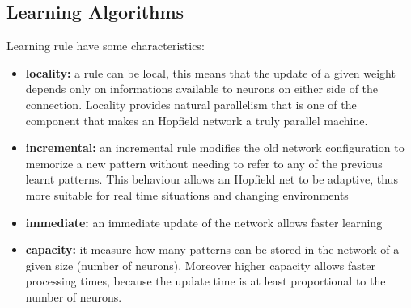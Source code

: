 \documentclass[letterpaper,twocolumn,10pt]{article}
\begin{document}
\subsection{Learning Algorithms}
Learning rule have some characteristics:
\begin{itemize}
\item\textbf{locality:} a rule can be local, this means that the update of a given weight depends only on informations available to neurons on either side of the connection. Locality provides natural parallelism that is one of the component that makes an Hopfield network a truly parallel machine.
\item\textbf{incremental:} an incremental rule modifies the old network configuration to memorize a new pattern without needing to refer to any of the previous learnt patterns. This behaviour allows an Hopfield net to be adaptive, thus more suitable for real time situations and changing environments
\item\textbf{immediate:} an immediate update of the network allows faster learning
\item\textbf{capacity:} it measure how many patterns can be stored in the network of a given size (number of neurons). Moreover higher capacity allows faster processing times, because the update time is at least proportional to the number of neurons. 
\end{itemize}
\end{document}
